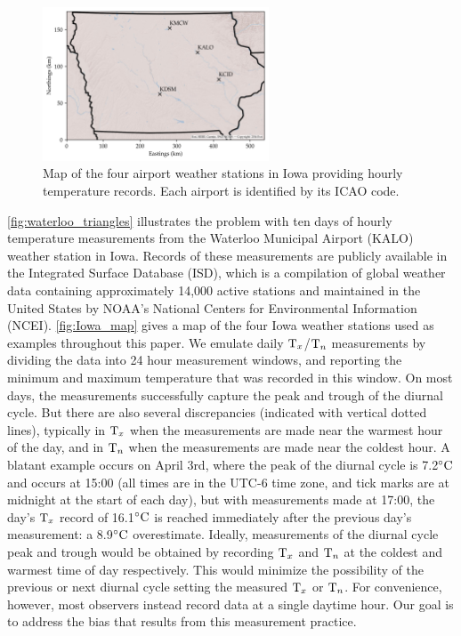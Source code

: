 \documentclass[12pt]{article}
\begin{document}
\begin{figure}[tbp]
\centering
\includegraphics[width=0.6\textwidth]{../figures/Iowa_map.png}
\caption{
\label{fig:Iowa_map}
Map of the four airport weather stations in Iowa providing hourly temperature records. 
Each airport is identified by its ICAO code.
}
\end{figure}

\autoref{fig:waterloo_triangles} illustrates the problem with ten days of hourly temperature measurements from the Waterloo Municipal Airport (KALO) weather station in Iowa. 
Records of these measurements are publicly available in the Integrated Surface Database (ISD), which is a compilation of global weather data containing approximately 14,000 active stations and maintained in the United States by NOAA's National Centers for Environmental Information (NCEI).
\autoref{fig:Iowa_map} gives a map of the four Iowa weather stations used as examples throughout this paper.
We emulate daily \(\mathrm{T}_{x}\)/\(\mathrm{T}_{n}\) measurements by dividing the data into 24 hour measurement windows, and reporting the minimum and maximum temperature that was recorded in this window.
On most days, the measurements successfully capture the peak and trough of the diurnal cycle.
But there are also several discrepancies (indicated with vertical dotted lines), typically in \(\mathrm{T}_{x}\) when the measurements are made near the warmest hour of the day, and in \(\mathrm{T}_{n}\) when the measurements are made near the coldest hour.
A blatant example occurs on April 3rd,
where the peak of the diurnal cycle is 7.2\({}^{\circ}\mathrm{C}\) and occurs at 15:00 (all times are in the UTC-6 time zone, and tick marks are at midnight at the start of each day), but with measurements made at 17:00, the day's \(\mathrm{T}_{x}\) record of 16.1\({}^{\circ}\mathrm{C}\) is reached immediately after the previous day's measurement: a 8.9\({}^{\circ}\mathrm{C}\) overestimate.
Ideally, measurements of the diurnal cycle peak and trough would be obtained by recording \(\mathrm{T}_{x}\) and \(\mathrm{T}_{n}\) at the coldest and warmest time of day respectively.
This would minimize the possibility of the previous or next diurnal cycle setting the measured \(\mathrm{T}_{x}\) or \(\mathrm{T}_{n}\).
For convenience, however, most observers instead record data at a single daytime hour.
Our goal is to address the bias that results from this measurement practice.
\end{document}
